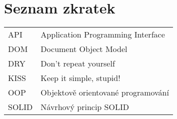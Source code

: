 \section*{Seznam zkratek}
\vspace{2em}

\noindent
\begin{tabular}{@{}ll@{}}
API	  &	Application Programming Interface\\
DOM	  &	Document Object Model\\
DRY	  &	Don't repeat yourself\\
KISS	&	Keep it simple, stupid!\\
OOP	  &	Objektově orientované programování\\
SOLID	&	Návrhový princip SOLID 
\end{tabular}

